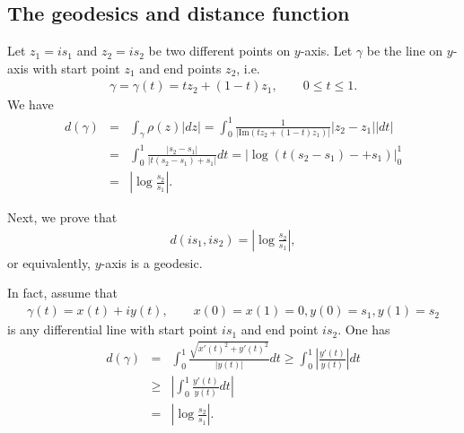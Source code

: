 \documentclass[11pt,reqno]{amsart}
\newcommand{\bna}{\begin{eqnarray*}}
\newcommand{\ena}{\end{eqnarray*}}
\def\im{{\mathrm{Im}}}
\theoremstyle{definition}
\begin{document}
\subsection{The geodesics and distance function}
Let $z_1=is_1$ and $z_2=is_2$ be two different points on $y$-axis.
Let $\gamma$ be the line on $y$-axis with start point $z_1$ and end points $z_2$,
i.e.
\bna
\gamma=\gamma(t)=tz_2+ (1-t)z_1,\qquad 0\leq t\leq 1.
\ena
We have
\bna
d(\gamma)&=&\int_{\gamma}\rho(z)|dz|=\int_{0}^1\frac{1}{|\im(tz_2+ (1-t)z_1)|}
|z_2-z_1||dt|\\
&=&\int_0^1\frac{|s_2-s_1|}{|t(s_2-s_1)+s_1|}dt=\left|\log (t(s_2-s_1)-+s_1)\right|
_{0}^1\\
&=&|\log\frac{s_2}{s_1}|.
\ena

Next, we prove that
\bna
d(is_1,is_2)=\left|\log\frac{s_2}{s_1}\right|,
\ena
or equivalently, $y$-axis is a geodesic.

In fact, assume that
\bna
\gamma(t)=x(t)+iy(t),\qquad  x(0)=x(1)=0,y(0)=s_1,y(1)=s_2
\ena
is any differential line with start point $is_1$ and end point $is_2$.
One has
\bna
d(\gamma)&=&\int_0^1\frac{\sqrt{x'(t)^2+y'(t)^2}}{|y(t)|}dt
\geq \int_0^1\left|\frac{y'(t)}{y(t)}\right|dt\\
&\geq& \left|\int_0^1\frac{y'(t)}{y(t)}dt\right|\\
&=&\left|\log\frac{s_2}{s_1}\right|.
\ena
\end{document}
